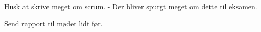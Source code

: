 Husk at skrive meget om scrum.
    - Der bliver spurgt meget om dette til eksamen. 
    
Send rapport til mødet lidt før.